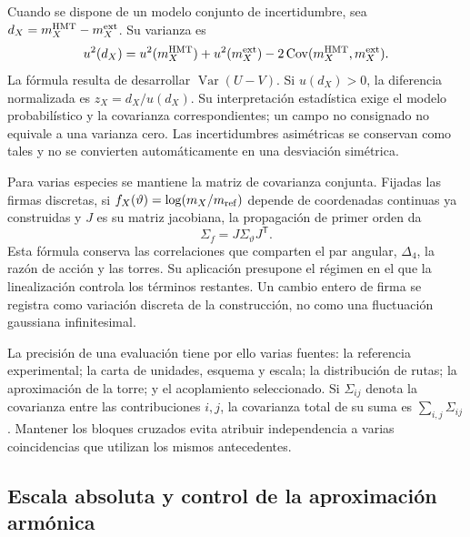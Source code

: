 Cuando se dispone de un modelo conjunto de incertidumbre, sea
\(d_X=m_X^{\rm HMT}-m_X^{\rm ext}\). Su varianza es
\[
 u^2(d_X)=u^2(m_X^{\rm HMT})+u^2(m_X^{\rm ext})
          -2\operatorname{Cov}(m_X^{\rm HMT},m_X^{\rm ext}).
\]
La fórmula resulta de desarrollar
\(\operatorname{Var}(U-V)\). Si \(u(d_X)>0\), la diferencia
normalizada es \(z_X=d_X/u(d_X)\). Su interpretación estadística exige
el modelo probabilístico y la covarianza correspondientes; un campo no
consignado no equivale a una varianza cero. Las incertidumbres asimétricas
se conservan como tales y no se convierten automáticamente en una desviación
simétrica.

Para varias especies se mantiene la matriz de covarianza conjunta. Fijadas
las firmas discretas, si \(f_X(\vartheta)=\log(m_X/m_{\rm ref})\)
depende de coordenadas continuas ya construidas y \(J\) es su matriz
jacobiana, la propagación de primer orden da
\[
 \Sigma_f=J\Sigma_\vartheta J^{\mathsf T}.
\]
Esta fórmula conserva las correlaciones que comparten el par angular,
\(\Delta_4\), la razón de acción y las torres. Su aplicación presupone
el régimen en el que la linealización controla los términos restantes.
Un cambio entero de firma se registra como variación discreta de la
construcción, no como una fluctuación gaussiana infinitesimal.

La precisión de una evaluación tiene por ello varias fuentes: la
referencia experimental; la carta de unidades, esquema y escala; la
distribución de rutas; la aproximación de la torre; y el acoplamiento
seleccionado. Si \(\Sigma_{ij}\) denota la covarianza entre las
contribuciones \(i,j\), la covarianza total de su suma es
\(\sum_{i,j}\Sigma_{ij}\). Mantener los bloques cruzados evita
atribuir independencia a varias coincidencias que utilizan los mismos
antecedentes.

\subsection{Escala absoluta y control de la aproximación armónica}
\label{subsec:vi-precision-torres}

